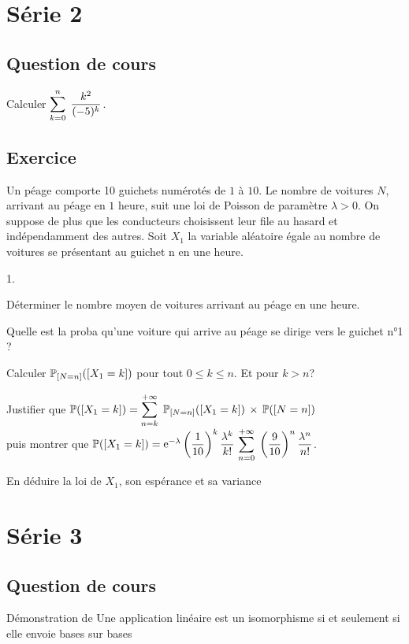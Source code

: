 \documentclass[11pt]{article}%
\begin{document}
\newpage

\section*{Série 2}
\subsection*{Question de cours}
Calculer $\displaystyle\sum\limits_{k=0}^{n}\hspace{.1cm} \dfrac{k^2}{(-5)^k}$.

\subsection*{Exercice}
\noindent
Un péage comporte 10 guichets numérotés de $1$ à $10$. Le nombre de 
voitures $N$, arrivant au péage en $1$ heure, suit une loi de Poisson 
de paramètre $\lambda > 0$. On suppose de plus que les conducteurs 
choisissent leur file au hasard et indépendamment des autres. Soit 
$X_1$ la variable aléatoire égale au nombre de voitures se présentant 
au guichet n en une heure.
\begin{noliste}{1.}
\item Déterminer le nombre moyen de voitures arrivant au péage en une 
heure.
\item Quelle est la proba qu'une voiture qui arrive au péage se dirige 
vers le guichet n°1 ? 
\item Calculer $\mathbb{P}_{\left[ {N=n} \right]}(\left[ {X_1 =k} \right])$ pour tout $0 \leq k \leq 
n$. Et pour $k>n$?
\item Justifier que $\mathbb{P}(\left[ {X_1 =k} \right])= \displaystyle\sum\limits_{n=k}^{+\infty}\hspace{.1cm} 
\mathbb{P}_{\left[ {N=n} \right]}(\left[ {X_1 =k} \right]) \, \times \, \mathbb{P}(\left[ {N =n} \right])$\\
puis montrer que $ \mathbb{P}(\left[ {X_1 =k} \right]) = \text{e}^{- \lambda} 
\left(\dfrac{1}{10}\right)^k \dfrac{\lambda^k}{k!} \, \displaystyle\sum\limits_{n=0}^{+ 
\infty}\hspace{.1cm}   \left(\dfrac{9}{10}\right)^n \dfrac{\lambda^n}{n!}$.
\item En déduire la loi de $X_1$, son espérance et sa variance
\end{noliste}


\newpage

\section*{Série 3}
\subsection*{Question de cours}
Démonstration de \og Une application linéaire est un isomorphisme si et 
seulement si elle envoie bases sur bases \fg{}
\end{document}
